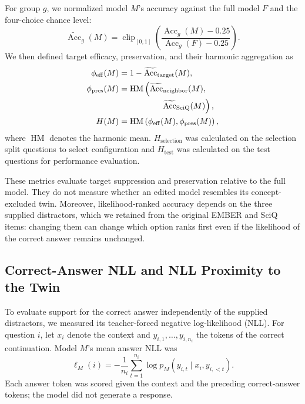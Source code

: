 For group $g$, we normalized model $M$'s accuracy against the full model $F$
and the four-choice chance level:
\begin{equation}
\widetilde{\operatorname{Acc}}_g(M)
=
\operatorname{clip}_{[0,1]}
\left(
\frac{\operatorname{Acc}_g(M)-0.25}
{\operatorname{Acc}_g(F)-0.25}
\right).
\end{equation}
We then defined target efficacy, preservation, and their harmonic aggregation
as
\begin{align}
\phi_{\mathrm{eff}}(M)
&=
1-\widetilde{\operatorname{Acc}}_{\mathrm{target}}(M),\\
\phi_{\mathrm{pres}}(M)
&=
\operatorname{HM}\left(
\widetilde{\operatorname{Acc}}_{\mathrm{neighbor}}(M),\right.\notag\\[-0.25ex]
&\hspace{5.1em}\left.
\widetilde{\operatorname{Acc}}_{\mathrm{SciQ}}(M)
\right),\\
H(M)
&=
\operatorname{HM}\left(
\phi_{\mathrm{eff}}(M),
\phi_{\mathrm{pres}}(M)
\right),
\end{align}
where $\operatorname{HM}$ denotes the harmonic mean.
$H_{\mathrm{selection}}$ was calculated on the selection split questions to select configuration and
$H_{\mathrm{test}}$ was calculated on the test questions for performance evaluation.

These metrics evaluate target suppression and preservation relative to the
full model. They do not measure whether an edited model resembles its
concept-excluded twin. Moreover, likelihood-ranked accuracy depends on the three supplied
distractors, which we retained from the original EMBER and SciQ items:
changing them can change which option ranks first even if the likelihood of
the correct answer remains unchanged.

\subsection{Correct-Answer NLL and NLL Proximity to the Twin}

To evaluate support for the correct answer independently of the supplied
distractors, we measured its teacher-forced negative log-likelihood (NLL). For
question $i$, let $x_i$ denote the context and
$y_{i,1},\ldots,y_{i,n_i}$ the tokens of the correct continuation. Model $M$'s
mean answer NLL was
\begin{equation}
\ell_M(i)
=
-\frac{1}{n_i}
\sum_{t=1}^{n_i}
\log p_M(y_{i,t}\mid x_i,y_{i,<t}).
\end{equation}
Each answer token was scored given the context and the preceding correct-answer
tokens; the model did not generate a response.

